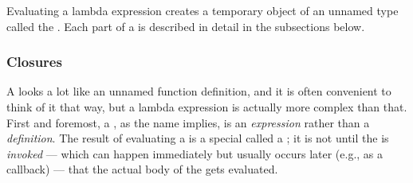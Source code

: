 \noindent Evaluating a lambda expression creates a temporary 
object of an unnamed type called the . Each part of
a  is described in detail in the subsections
below.

\subsubsection[Closures]{Closures}\label{closures}

A  looks a lot like an unnamed function
definition, and it is often convenient to think of it that way, but a
lambda expression is actually more complex than that. First and
foremost, a , as the name implies, is an
\emph{expression} rather than a \emph{definition}. The result of
evaluating a  is a special  called a ; it is not until the
 is \emph{invoked} --- which can happen immediately but
usually occurs later (e.g., as a callback) --- that the actual body of
the  gets evaluated.

